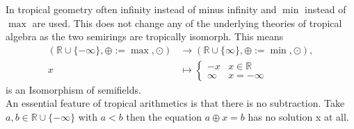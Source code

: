 \documentclass{article}
\theoremstyle{definition}
\begin{document}
In tropical geometry often infinity instead of minus infinity and $\min$ instead of $\max$ are used. This does not change any of the underlying theories of tropical algebra as the two semirings are tropically isomorph. This means
\begin{align*}
( \mathbb{R} \cup \{- \infty \} , \oplus := \max, \odot ) &\to ( \mathbb{R} \cup \{ \infty \} , \oplus := \min , \odot ), \\
x &\mapsto \begin{cases} -x & x \in \mathbb{R}\\
\infty & x = - \infty
\end{cases}
\end{align*}
is an Isomorphism of semifields. \\
An essential feature of tropical arithmetics is that there is no subtraction. Take $a, b \in \mathbb{R} \cup \{- \infty \}$ with $a < b$ then the equation $a \oplus x=b$ has no solution x at all. \cite[p.~11]{maclagan2015introduction} \\
\end{document}
